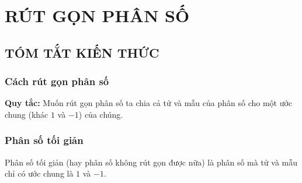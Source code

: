 \section{RÚT GỌN PHÂN SỐ}
\subsection{TÓM TẮT KIẾN THỨC}
\begin{tomtat}
	\subsubsection{Cách rút gọn phân số}
\textbf{Quy tắc:} Muốn rút gọn phân số ta chia cả tử và mẫu của phân số cho một ước chung (khác $1$ và $-1$) của chúng.
	\subsubsection{Phân số tối giản}
Phân số tối giản (hay phân số không rút gọn được nữa) là phân số mà tử và mẫu chỉ có ước chung là $1$ và $-1$.
\end{tomtat}
